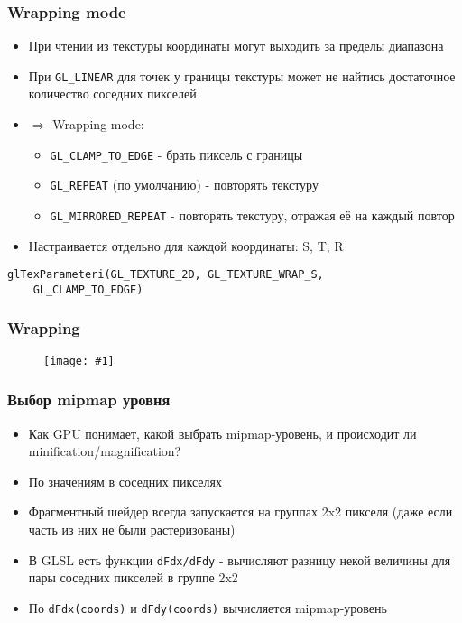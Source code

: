 \documentclass{beamer}
\newcommand{\slideimage}[1]{
  \begin{figure}
    \begin{adjustbox}{width=\textwidth, totalheight=\textheight-2\baselineskip-2\baselineskip,keepaspectratio}
      \texttt{[image: \#1]}
    \end{adjustbox}
  \end{figure}
}
\begin{document}
\begin{frame}[fragile]
\frametitle{Wrapping mode}
\begin{itemize}
\item При чтении из текстуры координаты могут выходить за пределы диапазона
\pause
\item При \verb|GL_LINEAR| для точек у границы текстуры может не найтись достаточное количество соседних пикселей
\pause
\item \begin{math}\Rightarrow\end{math} Wrapping mode:
\begin{itemize}
\item \verb|GL_CLAMP_TO_EDGE| - брать пиксель с границы
\item \verb|GL_REPEAT| (по умолчанию) - повторять текстуру
\item \verb|GL_MIRRORED_REPEAT| - повторять текстуру, отражая её на каждый повтор
\end{itemize}
\pause
\item Настраивается отдельно для каждой координаты: S, T, R
\end{itemize}
\begin{verbatim}
glTexParameteri(GL_TEXTURE_2D, GL_TEXTURE_WRAP_S,
    GL_CLAMP_TO_EDGE)
\end{verbatim}
\end{frame}

\begin{frame}
\frametitle{Wrapping}
\slideimage{wrapping.png}
\end{frame}

\begin{frame}[fragile]
\frametitle{Выбор mipmap уровня}
\begin{itemize}
\item Как GPU понимает, какой выбрать mipmap-уровень, и происходит ли minification/magnification?
\pause
\item По значениям в соседних пикселях
\pause
\item Фрагментный шейдер всегда запускается на группах 2x2 пикселя (даже если часть из них не были растеризованы)
\pause
\item В GLSL есть функции \verb|dFdx/dFdy| - вычисляют разницу некой величины для пары соседних пикселей в группе 2x2
\pause
\item По \verb|dFdx(coords)| и \verb|dFdy(coords)| вычисляется mipmap-уровень
\end{itemize}
\end{frame}
\end{document}
